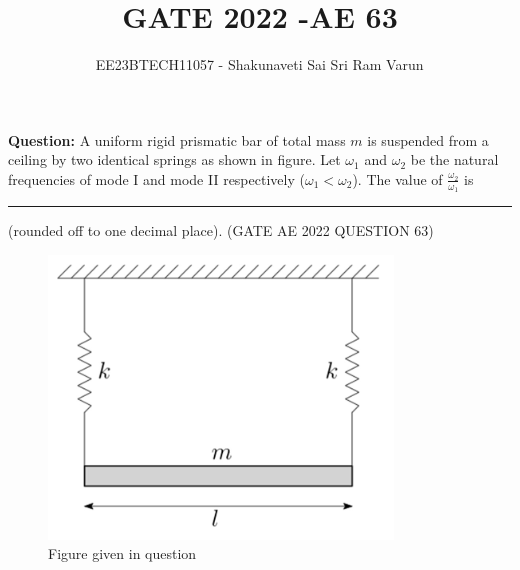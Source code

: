 \documentclass[journal,12pt,twocolumn]{IEEEtran}
\theoremstyle{remark}
\begin{document}

\vspace{3cm}

\title{GATE 2022  -AE 63}
\author{EE23BTECH11057 - Shakunaveti Sai Sri Ram Varun$^{}$%
}
\maketitle
\newpage
\bigskip
\vspace{2cm}
\textbf{Question: }
A uniform rigid prismatic bar of total mass $ m$ is suspended from a ceiling by two
identical springs as shown in figure.
Let $ \omega_1$ and $ \omega_2$ be the natural frequencies of mode I and mode II respectively
($ \omega_1 < \omega_2$).
The value of $ \frac{\omega_2}{\omega_1}$ is \rule{1cm}{0.15mm} (rounded off to one decimal place).
\hfill(GATE AE 2022 QUESTION 63)\\
\begin{figure}[h!]
    \includegraphics[width = \columnwidth]{figs/fig_qn.png}
    \caption{Figure given in question }
    \centering
    \label{fig: nm_63_fig_1}
\end{figure}
\end{document}

